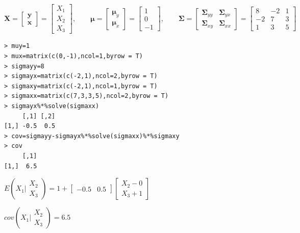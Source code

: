 \documentclass[12pt,a4paper]{report}
\begin{document}
\begin{enumerate}
\begin{enumerate}
$\mathbf{X}= \left[ \begin{array}{c} \mathbf{y} \\ \hline \mathbf{x} \end{array} \right]=\left[ \begin{array}{c} X_1 \\ \hline X_2 \\ X_3 \end{array} \right], \quad \quad \boldsymbol{\mu}=\left[ \begin{array}{c} \boldsymbol{\mu}_y \\ \hline \boldsymbol{\mu}_x \end{array} \right]=\left[ \begin{array}{c} 1\\ \hline 0\\ -1\end{array} \right], \quad \quad \boldsymbol{\Sigma}=\left[ \begin{array}{c|cc} \boldsymbol{\Sigma}_{yy} & \boldsymbol{\Sigma}_{yx}\\ \hline \boldsymbol{\Sigma}_{xy} & \boldsymbol{\Sigma}_{xx} \end{array} \right]=\left[ \begin{array}{c|cc} 8 & -2 & 1 \\ \hline -2 & 7 & 3 \\ 1 & 3 & 5 \end{array} \right]$

\begin{verbatim}
> muy=1
> mux=matrix(c(0,-1),ncol=1,byrow = T)
> sigmayy=8
> sigmayx=matrix(c(-2,1),ncol=2,byrow = T)
> sigmaxy=matrix(c(-2,1),ncol=1,byrow = T)
> sigmaxx=matrix(c(7,3,3,5),ncol=2,byrow = T)
> sigmayx%*%solve(sigmaxx)
     [,1] [,2]
[1,] -0.5  0.5
> cov=sigmayy-sigmayx%*%solve(sigmaxx)%*%sigmaxy
> cov
     [,1]
[1,]  6.5
\end{verbatim}

$E\left(X_1\Big|\begin{matrix}X_2 \\ X_3\end{matrix}\right)=1+\begin{bmatrix} -0.5 & 0.5\end{bmatrix}\begin{bmatrix} X_2-0 \\ X_3+1\end{bmatrix}$

$cov\left(X_1\Big|\begin{matrix}X_2 \\ X_3\end{matrix}\right)=6.5$\\


\end{enumerate}
\end{enumerate}
\end{document}
